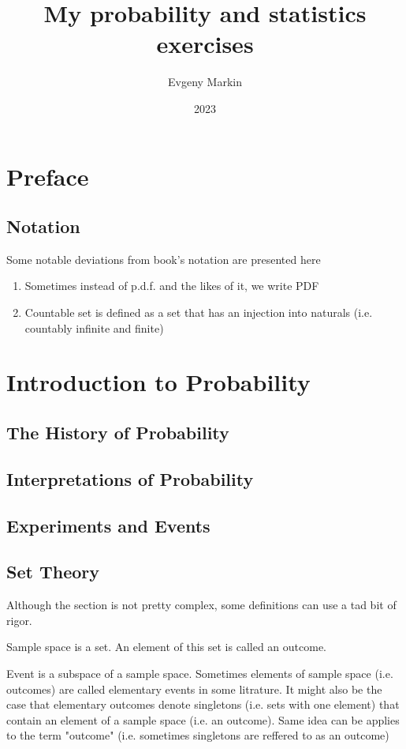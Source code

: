 \documentclass[11pt,oneside,titlepage]{book}
\title{My probability and statistics exercises}
\author{Evgeny Markin}
\date{2023}
\begin{document}
\maketitle
\tableofcontents

\chapter*{Preface}

\section{Notation}

Some notable deviations from book's notation are presented here
\begin{enumerate}
\item Sometimes instead of p.d.f. and the likes of it, we write PDF
\item Countable set is defined as a set that has an injection into naturals (i.e. countably infinite
  and finite)
\end{enumerate}

\chapter{Introduction to Probability}

\section{The History of Probability}

\section{Interpretations of Probability}

\section{Experiments and Events}

\section{Set Theory}

Although the section is not pretty complex, some definitions can use a tad bit of rigor.

Sample space is a set. An element of this set is called an outcome.

Event is a subspace of a sample space. Sometimes elements of sample space (i.e. outcomes)
are called elementary events in some litrature. It might also be the case that elementary
outcomes denote singletons (i.e. sets with one element) that contain an element of a sample space
(i.e. an outcome). Same idea can be applies to the term "outcome" (i.e. sometimes
singletons are reffered to as an outcome)
\end{document}
